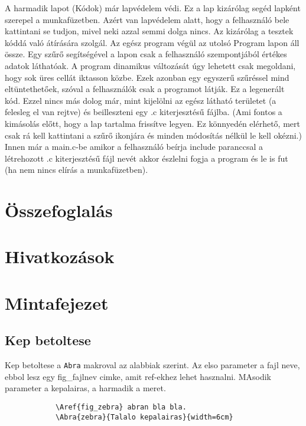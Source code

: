 \documentclass[12ppt,a4paper,oneside]{report}
\begin{document}
    A harmadik lapot (Kódok) már lapvédelem védi.
    Ez a lap kizárólag segéd lapként szerepel a munkafüzetben.
    Azért van lapvédelem alatt, hogy a felhasználó bele kattintani se tudjon, mivel neki azzal semmi dolga nincs. Az kizárólag a tesztek kóddá való átírására szolgál.
    Az egész program végül az utolsó Program lapon áll össze.
    Egy szűrő segítségével a lapon csak a felhasználó szempontjából értékes adatok láthatóak.
    A program dinamikus változását úgy lehetett csak megoldani, hogy sok üres cellát iktasson közbe.
    Ezek azonban egy egyszerű szűréssel mind eltüntethetőek, szóval a felhasználók csak a programot látják. Ez a legenerált kód.
    Ezzel nincs más dolog már, mint kijelölni az egész látható területet (a felesleg el van rejtve) és beilleszteni egy .c kiterjesztésű fájlba. (Ami fontos a kimásolás előtt, hogy a lap tartalma frissítve legyen.
    Ez könnyedén elérhető, mert csak rá kell kattintani a szűrő ikonjára és minden módosítás nélkül le kell okézni.)
    Innen már a main.c-be amikor a felhasználó beírja include paranccsal a létrehozott .c kiterjesztésű fájl nevét akkor észlelni fogja a program és le is fut (ha nem nincs elírás a munkafüzetben).

\chapter{Összefoglalás} %

\chapter*{Hivatkozások}

\appendix

\chapter{Mintafejezet}
    \section{Kep betoltese}
        Kep betoltese a \texttt{Abra} makroval az alabbiak szerint. Az elso parameter a fajl neve, ebbol lesz egy fig\_fajlnev cimke, amit ref-ekhez lehet hasznalni. MAsodik parameter a kepalairas, a harmadik a meret.
        \begin{verbatim}
            \Aref{fig_zebra} abran bla bla.
            \Abra{zebra}{Talalo kepalairas}{width=6cm}
        \end{verbatim}
\end{document}
